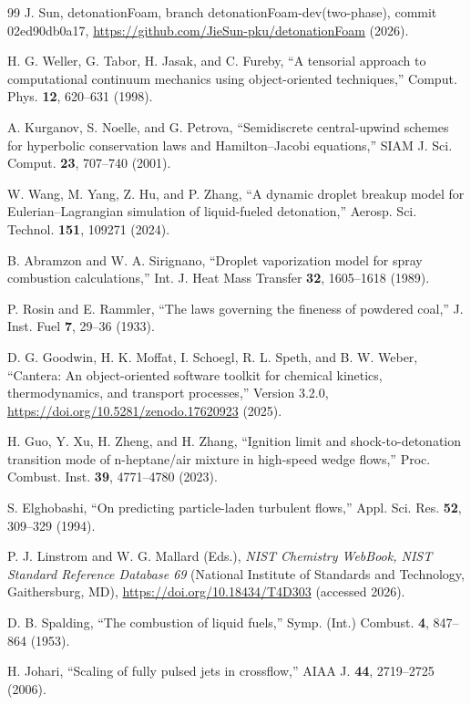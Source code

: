 \documentclass[aip,pof,preprint,amsmath,amssymb]{revtex4-2}
\begin{document}
\begin{thebibliography}{99}
 J. Sun, detonationFoam, branch detonationFoam-dev(two-phase), commit 02ed90db0a17, \url{https://github.com/JieSun-pku/detonationFoam} (2026).

 H. G. Weller, G. Tabor, H. Jasak, and C. Fureby, ``A tensorial approach to computational continuum mechanics using object-oriented techniques,'' Comput. Phys. \textbf{12}, 620--631 (1998).

 A. Kurganov, S. Noelle, and G. Petrova, ``Semidiscrete central-upwind schemes for hyperbolic conservation laws and Hamilton--Jacobi equations,'' SIAM J. Sci. Comput. \textbf{23}, 707--740 (2001).

 W. Wang, M. Yang, Z. Hu, and P. Zhang, ``A dynamic droplet breakup model for Eulerian--Lagrangian simulation of liquid-fueled detonation,'' Aerosp. Sci. Technol. \textbf{151}, 109271 (2024).

 B. Abramzon and W. A. Sirignano, ``Droplet vaporization model for spray combustion calculations,'' Int. J. Heat Mass Transfer \textbf{32}, 1605--1618 (1989).

 P. Rosin and E. Rammler, ``The laws governing the fineness of powdered coal,'' J. Inst. Fuel \textbf{7}, 29--36 (1933).

 D. G. Goodwin, H. K. Moffat, I. Schoegl, R. L. Speth, and B. W. Weber, ``Cantera: An object-oriented software toolkit for chemical kinetics, thermodynamics, and transport processes,'' Version 3.2.0, \url{https://doi.org/10.5281/zenodo.17620923} (2025).

 H. Guo, Y. Xu, H. Zheng, and H. Zhang, ``Ignition limit and shock-to-detonation transition mode of n-heptane/air mixture in high-speed wedge flows,'' Proc. Combust. Inst. \textbf{39}, 4771--4780 (2023).

 S. Elghobashi, ``On predicting particle-laden turbulent flows,'' Appl. Sci. Res. \textbf{52}, 309--329 (1994).

 P. J. Linstrom and W. G. Mallard (Eds.), \textit{NIST Chemistry WebBook, NIST Standard Reference Database 69} (National Institute of Standards and Technology, Gaithersburg, MD), \url{https://doi.org/10.18434/T4D303} (accessed 2026).

 D. B. Spalding, ``The combustion of liquid fuels,'' Symp. (Int.) Combust. \textbf{4}, 847--864 (1953).

 H. Johari, ``Scaling of fully pulsed jets in crossflow,'' AIAA J. \textbf{44}, 2719--2725 (2006).


\end{thebibliography}
\end{document}
